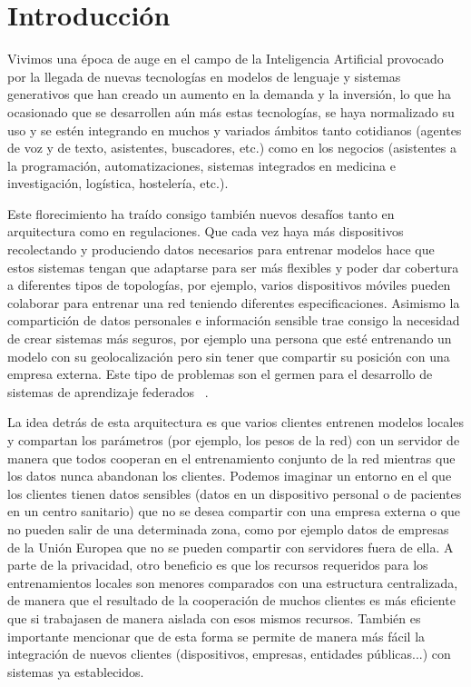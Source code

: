 
\chapter{Introducción} \label{cap1}

\vspace*{5mm}

Vivimos una época de auge en el campo de la Inteligencia Artificial provocado por la llegada de nuevas tecnologías en modelos de lenguaje y sistemas generativos que han creado un aumento en la demanda y la inversión, lo que ha ocasionado que se desarrollen aún más estas tecnologías, se haya normalizado su uso y se estén integrando en muchos y variados ámbitos tanto cotidianos (agentes de voz y de texto, asistentes, buscadores, etc.) como en los negocios (asistentes a la programación, automatizaciones, sistemas integrados en medicina e investigación, logística, hostelería, etc.).

Este florecimiento ha traído consigo también nuevos desafíos tanto en arquitectura como en regulaciones. Que cada vez haya más dispositivos recolectando y produciendo datos necesarios para entrenar modelos hace que estos sistemas tengan que adaptarse para ser más flexibles y poder dar cobertura a diferentes tipos de topologías, por ejemplo, varios dispositivos móviles pueden colaborar para entrenar una red teniendo diferentes especificaciones. Asimismo la compartición de datos personales e información sensible trae consigo la necesidad de crear sistemas más seguros, por ejemplo una persona que esté entrenando un modelo con su geolocalización pero sin tener que compartir su posición con una empresa externa. Este tipo de problemas son el germen para el desarrollo de sistemas de aprendizaje federados ~\cite{Yang_FL}.

La idea detrás de esta arquitectura es que varios clientes entrenen modelos locales y compartan los parámetros (por ejemplo, los pesos de la red) con un servidor de manera que todos cooperan en el entrenamiento conjunto de la red mientras que los datos nunca abandonan los clientes. Podemos imaginar un entorno en el que los clientes tienen datos sensibles (datos en un dispositivo personal o de pacientes en un centro sanitario) que no se desea compartir con una empresa externa o que no pueden salir de una determinada zona, como por ejemplo datos de empresas de la Unión Europea que no se pueden compartir con servidores fuera de ella. A parte de la privacidad, otro beneficio es que los recursos requeridos para los entrenamientos locales son menores comparados con una estructura centralizada, de manera que el resultado de la cooperación de muchos clientes es más eficiente que si trabajasen de manera aislada con esos mismos recursos. También es importante mencionar que de esta forma se permite de manera más fácil la integración de nuevos clientes (dispositivos, empresas, entidades públicas...) con sistemas ya establecidos.

